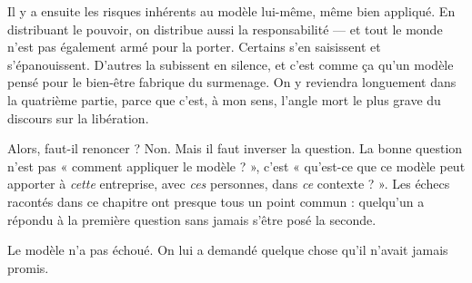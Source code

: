 Il y a ensuite les risques inhérents au modèle lui-même, même bien appliqué. En distribuant le pouvoir, on distribue aussi la responsabilité — et tout le monde n'est pas également armé pour la porter. Certains s'en saisissent et s'épanouissent. D'autres la subissent en silence, et c'est comme ça qu'un modèle pensé pour le bien-être fabrique du surmenage. On y reviendra longuement dans la quatrième partie, parce que c'est, à mon sens, l'angle mort le plus grave du discours sur la libération.

Alors, faut-il renoncer ? Non. Mais il faut inverser la question. La bonne question n'est pas « comment appliquer le modèle ? », c'est « qu'est-ce que ce modèle peut apporter à \emph{cette} entreprise, avec \emph{ces} personnes, dans \emph{ce} contexte ? ». Les échecs racontés dans ce chapitre ont presque tous un point commun : quelqu'un a répondu à la première question sans jamais s'être posé la seconde.

Le modèle n'a pas échoué. On lui a demandé quelque chose qu'il n'avait jamais promis.
